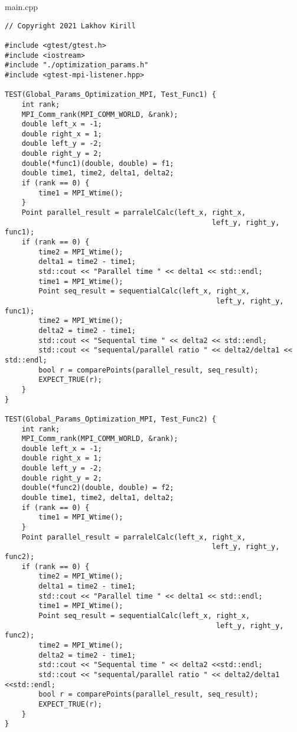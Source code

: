\documentclass{report}
\begin{document}
main.cpp
\begin{lstlisting}
// Copyright 2021 Lakhov Kirill

#include <gtest/gtest.h>
#include <iostream>
#include "./optimization_params.h"
#include <gtest-mpi-listener.hpp>

TEST(Global_Params_Optimization_MPI, Test_Func1) {
    int rank;
    MPI_Comm_rank(MPI_COMM_WORLD, &rank);
    double left_x = -1;
    double right_x = 1;
    double left_y = -2;
    double right_y = 2;
    double(*func1)(double, double) = f1;
    double time1, time2, delta1, delta2;
    if (rank == 0) {
        time1 = MPI_Wtime();
    }
    Point parallel_result = parralelCalc(left_x, right_x,
                                                 left_y, right_y, func1);
    if (rank == 0) {
        time2 = MPI_Wtime();
        delta1 = time2 - time1;
        std::cout << "Parallel time " << delta1 << std::endl;
        time1 = MPI_Wtime();
        Point seq_result = sequentialCalc(left_x, right_x,
                                                  left_y, right_y, func1);
        time2 = MPI_Wtime();
        delta2 = time2 - time1;
        std::cout << "Sequental time " << delta2 << std::endl;
        std::cout << "sequental/parallel ratio " << delta2/delta1 << std::endl;
        bool r = comparePoints(parallel_result, seq_result);
        EXPECT_TRUE(r);
    }
}

TEST(Global_Params_Optimization_MPI, Test_Func2) {
    int rank;
    MPI_Comm_rank(MPI_COMM_WORLD, &rank);
    double left_x = -1;
    double right_x = 1;
    double left_y = -2;
    double right_y = 2;
    double(*func2)(double, double) = f2;
    double time1, time2, delta1, delta2;
    if (rank == 0) {
        time1 = MPI_Wtime();
    }
    Point parallel_result = parralelCalc(left_x, right_x,
                                                 left_y, right_y, func2);
    if (rank == 0) {
        time2 = MPI_Wtime();
        delta1 = time2 - time1;
        std::cout << "Parallel time " << delta1 << std::endl;
        time1 = MPI_Wtime();
        Point seq_result = sequentialCalc(left_x, right_x,
                                                  left_y, right_y, func2);
        time2 = MPI_Wtime();
        delta2 = time2 - time1;
        std::cout << "Sequental time " << delta2 <<std::endl;
        std::cout << "sequental/parallel ratio " << delta2/delta1 <<std::endl;
        bool r = comparePoints(parallel_result, seq_result);
        EXPECT_TRUE(r);
    }
}


\end{lstlisting}
\end{document}

